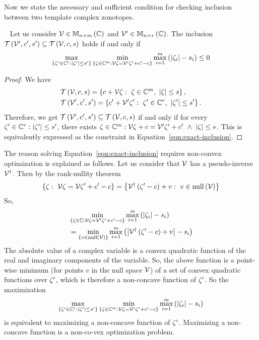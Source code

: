 Now we state the necessary and sufficient condition for checking
inclusion between two template complex zonotopes.
%
\begin{lemma}~\label{lem:exact-inclusion}
Let us consider $\mathcal{V}\in\mathbb{M}_{n\times m}\left(\mathbb{C}\right)$ and
$\mathcal{V}^\prime\in\mathbb{M}_{n\times r}\left(\mathbb{C}\right)$.  The inclusion
$\mathit{\operatorname{\mathcal{T}}}\left(\mathcal{V}^\prime,c^\prime,s^\prime\right)\subseteq\mathit{\operatorname{\mathcal{T}}}\left(\mathcal{V},c,s\right)$
holds if and only if
\begin{equation}\label{eqn:exact-inclusion}
\max_{\left\{\zeta^\prime\in\mathbb{C}^{r}:\left|\zeta^\prime\right|\leq s^\prime\right\}}\min_{\left\{\zeta\in\mathbb{C}^m:\mathcal{V}\zeta=\mathcal{V}^\prime\zeta^\prime+c^\prime-c\right\}}\max_{i=1}^m\left(\left|\zeta_i\right|-s_i\right)\leq 0
\end{equation}
\end{lemma}
%
\begin{proof}
  We have
  \begin{align*}
    &\mathit{\operatorname{\mathcal{T}}}\left(\mathcal{V},c,s\right)=\left\{c+\mathcal{V}\zeta:~\zeta\in\mathbb{C}^m,~\left|\zeta\right|\leq s\right\},\\
    &\mathit{\operatorname{\mathcal{T}}}\left(\mathcal{V}^\prime,c^\prime,s^\prime\right)=\left\{c^\prime+\mathcal{V}^\prime\zeta^\prime:~\zeta^\prime\in\mathbb{C}^r,~\left|\zeta^\prime\right|\leq s^\prime\right\}.
  \end{align*}
Therefore, we get
$\mathit{\operatorname{\mathcal{T}}}\left(\mathcal{V}^\prime,c^\prime,s^\prime\right)\subseteq\mathit{\operatorname{\mathcal{T}}}\left(\mathcal{V},c,s\right)$
if and only if
for every $\zeta^\prime\in\mathbb{C}^r:\left|\zeta^\prime\right|\leq s^\prime$,
there exists
$\zeta\in\mathbb{C}^m:\mathcal{V}\zeta+c=\mathcal{V}^\prime\zeta^\prime+c^\prime~\wedge~\left|\zeta\right|\leq
s$.  This is equivalently expressed as the constraint in Equation~\ref{eqn:exact-inclusion}.
\end{proof}
%
The reason solving Equation~\ref{eqn:exact-inclusion}
requires non-convex optimization is explained as follows.  Let us consider
that $\mathcal{V}$ has a pseudo-inverse ${\mathcal{V}}^\dagger$.  Then by the
rank-nullity theorem
%
\[
\left\{\zeta:~\mathcal{V}\zeta=\mathcal{V}\zeta^\prime+c^\prime-c\right\}=\left\{{\mathcal{V}}^\dagger\left(\zeta^\prime-c\right)+v:~v\in\operatorname{null}\left(\mathcal{V}\right)\right\}
\]
%
So,
%
\begin{align*}
& \min_{\left\{\zeta\in\mathbb{C}:\mathcal{V}\zeta=\mathcal{V}^\prime\zeta^\prime+c^\prime-c\right\}}\max_{i=1}^m\left(\left|\zeta_i\right|-s_i\right)\\
&
=\min_{\left\{v\in\operatorname{null}\left(\mathcal{V}\right)\right\}}\max_{i=1}^m\left(\left|{\mathcal{V}}^\dagger\left(\zeta^\prime-c\right)+v\right|-s_i\right)
\end{align*}
%
The absolute value of a complex variable is a convex quadratic
function of the real and imaginary components of the variable.  So,
the above function is a point-wise minimum (for points $v$ in the null
space $\null{\ptemp}$) of a set of convex quadratic functions over
$\zeta^\prime$, which is therefore a non-concave function of $\zeta^\prime$.
So the maximization
%
\[
\max_{\left\{\zeta^\prime\in\mathbb{C}^{r}:\left|\zeta^\prime\right|\leq s^\prime\right\}}\min_{\left\{\zeta\in\mathbb{C}^m:\mathcal{V}\zeta=\mathcal{V}^\prime\zeta^\prime+c^\prime-c\right\}}\max_{i=1}^m\left(\left|\zeta_i\right|-s_i\right)
\]
%
is equivalent to maximizing a non-concave function of $\zeta^\prime$.
Maximizing a non-concave function is a non-co-vex optimization problem.

